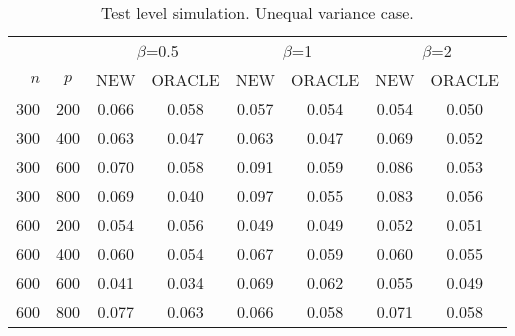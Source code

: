 \begin{table}[ht]

\caption{Test level simulation. Unequal variance case.} 
\label{biaoge2}
    \vspace{3mm}
\centering
\begin{tabular}{rccccccc}
  \toprule
    &  & \multicolumn{2}{c}{$\beta$=0.5} & \multicolumn{2}{c}{$\beta$=1}& \multicolumn{2}{c}{$\beta$=2}   \\
    \cmidrule(r){3-4}
    \cmidrule(r){5-6}
    \cmidrule(r){7-8}
$n$ & $p$ & NEW & ORACLE & NEW & ORACLE & NEW & ORACLE \\ 
\midrule
300 & 200 & 0.066 & 0.058 & 0.057 & 0.054 & 0.054 & 0.050 \\ 
  300 & 400 & 0.063 & 0.047 & 0.063 & 0.047 & 0.069 & 0.052 \\ 
  300 & 600 & 0.070 & 0.058 & 0.091 & 0.059 & 0.086 & 0.053 \\ 
  300 & 800 & 0.069 & 0.040 & 0.097 & 0.055 & 0.083 & 0.056 \\ 
  600 & 200 & 0.054 & 0.056 & 0.049 & 0.049 & 0.052 & 0.051 \\ 
  600 & 400 & 0.060 & 0.054 & 0.067 & 0.059 & 0.060 & 0.055 \\ 
  600 & 600 & 0.041 & 0.034 & 0.069 & 0.062 & 0.055 & 0.049 \\ 
  600 & 800 & 0.077 & 0.063 & 0.066 & 0.058 & 0.071 & 0.058 \\ 
   \bottomrule
\end{tabular}

\end{table}
